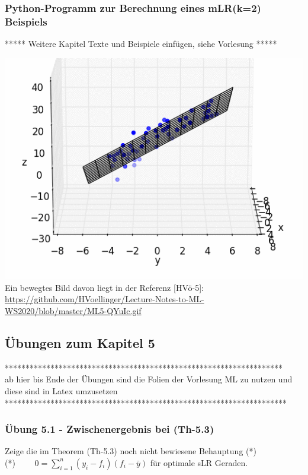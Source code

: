 \documentclass[12pt]{article}
\begin{document}
\subsubsection{Python-Programm zur Berechnung eines mLR(k=2) Beispiels}

{\color{red}
{***** Weitere Kapitel Texte und Beispiele einfügen, siehe Vorlesung *****}}


\includegraphics{ML5-MovingPicture_mLR}\\
%
Ein bewegtes Bild davon liegt in der Referenz [HVö-5]: 
{\url{https://github.com/HVoellinger/Lecture-Notes-to-ML-WS2020/blob/master/ML5-QYuIc.gif}}

\subsection{Übungen zum Kapitel 5}
{\color{red}
{*******************************************************************\\ 
ab hier bis Ende der Übungen sind die Folien der Vorlesung ML  zu nutzen und diese sind in Latex umzusetzen\\
********************************************************************\\}}


\subsubsection{Übung 5.1 - Zwischenergebnis bei (Th-5.3)}

Zeige die im Theorem (Th-5.3) noch nicht bewiesene Behauptung (*)\\ 
(*) $ \qquad 0 = \sum_{i=1}^{n} (y_i - f_i)(f_i - \bar{y})$ für optimale sLR Geraden. 
\end{document}
